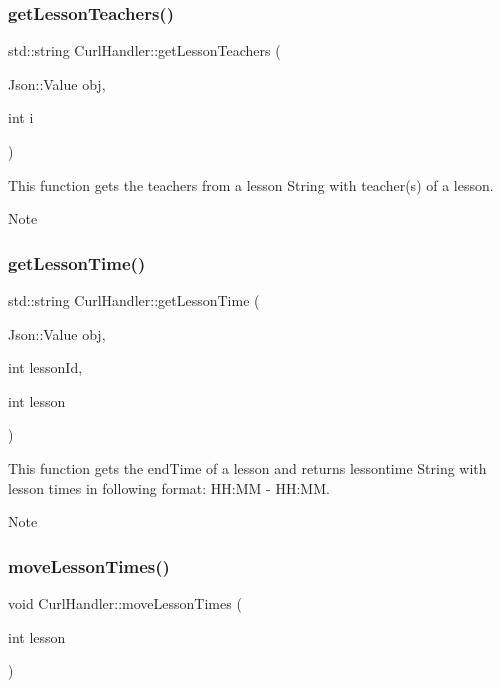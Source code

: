 \subsubsection{\texorpdfstring{get\+Lesson\+Teachers()}{getLessonTeachers()}}
{\footnotesize\ttfamily std\+::string Curl\+Handler\+::get\+Lesson\+Teachers (\begin{DoxyParamCaption}\item[{Json\+::\+Value}]{obj,  }\item[{int}]{i }\end{DoxyParamCaption})}



This function gets the teachers from a lesson  String with teacher(s) of a lesson. 

\begin{DoxyNote}{Note}

\end{DoxyNote}
\mbox{\label{classCurlHandler_aa62b036298bc0ca7365cb32919996a54}} 
\subsubsection{\texorpdfstring{get\+Lesson\+Time()}{getLessonTime()}}
{\footnotesize\ttfamily std\+::string Curl\+Handler\+::get\+Lesson\+Time (\begin{DoxyParamCaption}\item[{Json\+::\+Value}]{obj,  }\item[{int}]{lesson\+Id,  }\item[{int}]{lesson }\end{DoxyParamCaption})}



This function gets the end\+Time of a lesson and returns lessontime  String with lesson times in following format\+: HH\+:MM -\/ HH\+:MM. 

\begin{DoxyNote}{Note}

\end{DoxyNote}
\mbox{\label{classCurlHandler_af6808f78b075e81747be9ff5c19a8b61}} 
\subsubsection{\texorpdfstring{move\+Lesson\+Times()}{moveLessonTimes()}}
{\footnotesize\ttfamily void Curl\+Handler\+::move\+Lesson\+Times (\begin{DoxyParamCaption}\item[{int}]{lesson }\end{DoxyParamCaption})}



